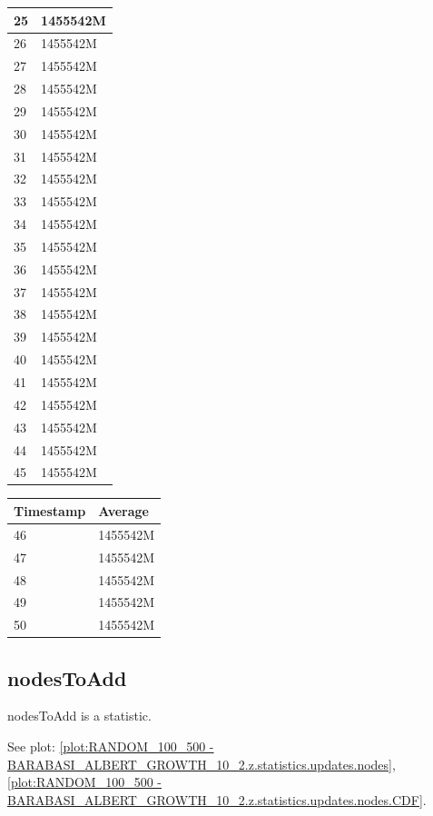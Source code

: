 \begin{tabular}{|l||l|}
	25 & 1455542M \\ \hline
	26 & 1455542M \\ \hline
	27 & 1455542M \\ \hline
	28 & 1455542M \\ \hline
	29 & 1455542M \\ \hline
	30 & 1455542M \\ \hline
	31 & 1455542M \\ \hline
	32 & 1455542M \\ \hline
	33 & 1455542M \\ \hline
	34 & 1455542M \\ \hline
	35 & 1455542M \\ \hline
	36 & 1455542M \\ \hline
	37 & 1455542M \\ \hline
	38 & 1455542M \\ \hline
	39 & 1455542M \\ \hline
	40 & 1455542M \\ \hline
	41 & 1455542M \\ \hline
	42 & 1455542M \\ \hline
	43 & 1455542M \\ \hline
	44 & 1455542M \\ \hline
	45 & 1455542M \\ \hline
\end{tabular}
\begin{tabular}{|l||l|}
\hline
	\textbf{Timestamp} & \textbf{Average} \\ \hline
	46 & 1455542M \\ \hline
	47 & 1455542M \\ \hline
	48 & 1455542M \\ \hline
	49 & 1455542M \\ \hline
	50 & 1455542M \\ \hline
\end{tabular}

\subsection{nodesToAdd}
nodesToAdd is a statistic.

See plot: \ref{plot:RANDOM_100_500 - BARABASI_ALBERT_GROWTH_10_2.z.statistics.updates.nodes}, \ref{plot:RANDOM_100_500 - BARABASI_ALBERT_GROWTH_10_2.z.statistics.updates.nodes.CDF}.

